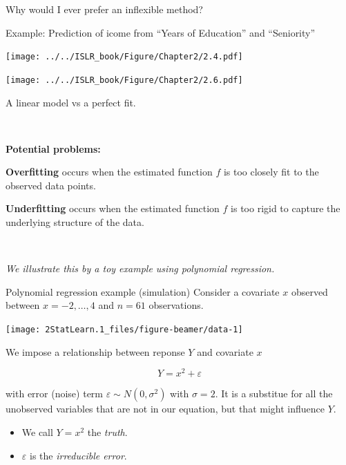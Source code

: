 \documentclass[
  ignorenonframetext,
]{beamer}
\providecommand{\tightlist}{%
  \setlength{\itemsep}{0pt}\setlength{\parskip}{0pt}}
\begin{document}
\begin{frame}
\begin{block}{Why would I ever prefer an inflexible method?}
\protect\hypertarget{why-would-i-ever-prefer-an-inflexible-method}{}
\(~\)

Example: Prediction of icome from ``Years of Education'' and
``Seniority''\vspace{2mm}

\centering

\texttt{[image: ../../ISLR\_book/Figure/Chapter2/2.4.pdf]}

\texttt{[image: ../../ISLR\_book/Figure/Chapter2/2.6.pdf]}

A linear model vs a perfect fit.
\end{block}
\end{frame}

\begin{frame}
\(~\)

\textbf{Potential problems:}

\textbf{Overfitting} occurs when the estimated function \(f\) is too
closely fit to the observed data points.

\textbf{Underfitting} occurs when the estimated function \(f\) is too
rigid to capture the underlying structure of the data.

\(~\)

\emph{We illustrate this by a toy example using polynomial regression.}
\end{frame}

\begin{frame}
\begin{block}{Polynomial regression example (simulation)}
\protect\hypertarget{polynomial-regression-example-simulation}{}
Consider a covariate \(x\) observed between \(x=-2, \ldots , 4\) and
\(n=61\) observations.

\begin{center}\texttt{[image: 2StatLearn.1\_files/figure-beamer/data-1]} \end{center}
\end{block}
\end{frame}

\begin{frame}
We impose a relationship between reponse \(Y\) and covariate \(x\)

\[ Y=x^2 + \varepsilon\]

with error (noise) term \(\varepsilon\sim N(0,\sigma^2)\) with
\(\sigma=2\). It is a substitue for all the unobserved variables that
are not in our equation, but that might influence \(Y\).

\begin{itemize}
\tightlist
\item
  We call \(Y=x^2\) the \emph{truth}.
\item
  \(\varepsilon\) is the \emph{irreducible error}.
\end{itemize}
\end{frame}
\end{document}

